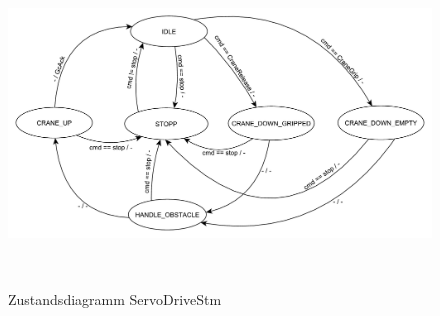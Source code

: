 \documentclass[main.tex]{subfiles} %
\begin{document}
\begin{figure}[H]
    \centering
    \includegraphics[width=1\linewidth]{./fig_Firmware_GripController/ServoDriveStm.pdf}
    \caption{Zustandsdiagramm ServoDriveStm}~\label{fig:ServoDriveStm}
\end{figure}



\end{document}
